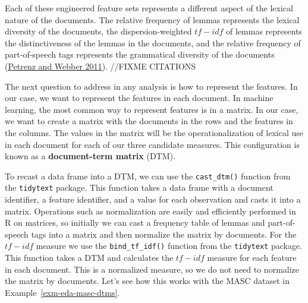 \documentclass[
  letterpaper,
  DIV=11,
  numbers=noendperiod]{scrreport}
\theoremstyle{definition}
\theoremstyle{remark}
\begin{document}
Each of these engineered feature sets represents a different aspect of
the lexical nature of the documents. The relative frequency of lemmas
represents the lexical diversity of the documents, the
dispersion-weighted \(tf-idf\) of lemmas represents the distinctiveness
of the lemmas in the documents, and the relative frequency of
part-of-speech tags represents the grammatical diversity of the
documents (\protect\hyperlink{ref-Petrenz2011}{Petrenz and Webber
2011}). //FIXME CITATIONS

The next question to address in any analysis is how to represent the
features. In our case, we want to represent the features in each
document. In machine learning, the most common way to represent features
is in a matrix. In our case, we want to create a matrix with the
documents in the rows and the features in the columns. The values in the
matrix will be the operationalization of lexical use in each document
for each of our three candidate measures. This configuration is known as
a \textbf{document-term matrix} (DTM).

To recast a data frame into a DTM, we can use the \texttt{cast\_dtm()}
function from the \texttt{tidytext} package. This function takes a data
frame with a document identifier, a feature identifier, and a value for
each observation and casts it into a matrix. Operations such as
normalization are easily and efficiently performed in R on matrices, so
initially we can cast a frequency table of lemmas and part-of-speech
tags into a matrix and then normalize the matrix by documents. For the
\(tf-idf\) measure we use the \texttt{bind\_tf\_idf()} function from the
\texttt{tidytext} package. This function takes a DTM and calculates the
\(tf-idf\) measure for each feature in each document. This is a
normalized measure, so we do not need to normalize the matrix by
documents. Let's see how this works with the MASC dataset in
Example~\ref{exm-eda-masc-dtms}.
\end{document}
